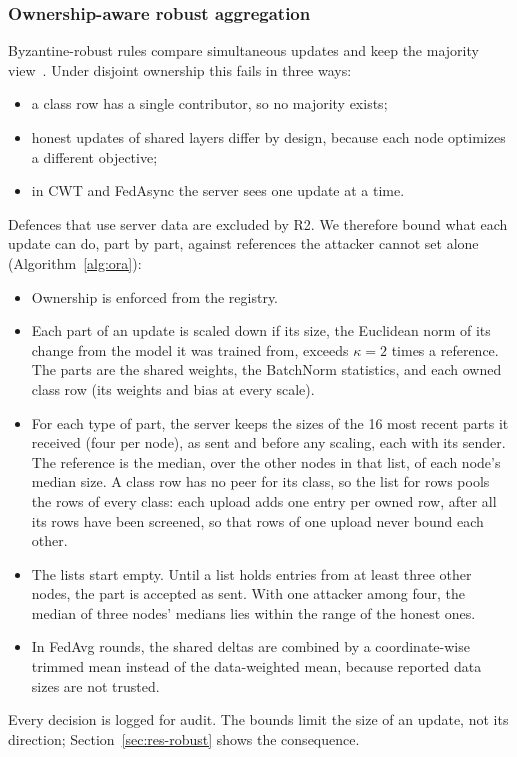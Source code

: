 \documentclass[pdflatex,sn-mathphys-num]{sn-jnl}
\begin{document}
\subsubsection{Ownership-aware robust aggregation}\label{sec:defence}
Byzantine-robust rules compare simultaneous updates and keep the majority view~\cite{blanchard2017krum,yin2018byzantine}. Under disjoint ownership this fails in three ways:
\begin{itemize}
\item a class row has a single contributor, so no majority exists;
\item honest updates of shared layers differ by design, because each node optimizes a different objective;
\item in CWT and FedAsync the server sees one update at a time.
\end{itemize}
Defences that use server data are excluded by R2. We therefore bound what each update can do, part by part, against references the attacker cannot set alone (Algorithm~\ref{alg:ora}):
\begin{itemize}
\item Ownership is enforced from the registry.
\item Each part of an update is scaled down if its size, the Euclidean norm of its change from the model it was trained from, exceeds $\kappa=2$ times a reference. The parts are the shared weights, the BatchNorm statistics, and each owned class row (its weights and bias at every scale).
\item For each type of part, the server keeps the sizes of the 16 most recent parts it received (four per node), as sent and before any scaling, each with its sender. The reference is the median, over the other nodes in that list, of each node's median size. A class row has no peer for its class, so the list for rows pools the rows of every class: each upload adds one entry per owned row, after all its rows have been screened, so that rows of one upload never bound each other.
\item The lists start empty. Until a list holds entries from at least three other nodes, the part is accepted as sent. With one attacker among four, the median of three nodes' medians lies within the range of the honest ones.
\item In FedAvg rounds, the shared deltas are combined by a coordinate-wise trimmed mean instead of the data-weighted mean, because reported data sizes are not trusted.
\end{itemize}
Every decision is logged for audit. The bounds limit the size of an update, not its direction; Section~\ref{sec:res-robust} shows the consequence.
\end{document}
